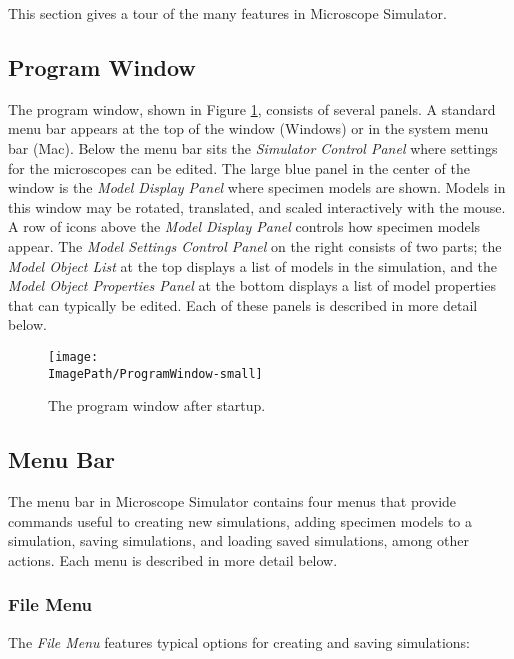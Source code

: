 \documentclass[11pt,titlepage,twoside]{article}
\begin{document}
This section gives a tour of the many features in Microscope Simulator.

\subsection{Program Window}

The program window, shown in Figure \ref{fig:ProgramWindow}, consists of several panels. A standard menu bar appears at the top of the window (Windows) or in the system menu bar (Mac). Below the menu bar sits the \emph{Simulator Control Panel} where settings for the microscopes can be edited. The large blue panel in the center of the window is the \emph{Model Display Panel} where specimen models are shown. Models in this window may be rotated, translated, and scaled interactively with the mouse. A row of icons above the \emph{Model Display Panel} controls how specimen models appear. The \emph{Model Settings Control Panel} on the right consists of two parts; the \emph{Model Object List} at the top displays a list of models in the simulation, and the \emph{Model Object Properties Panel} at the bottom displays a list of model properties that can typically be edited. Each of these panels is described in more detail below.

\begin{figure}[htbp] %
   \centering
   \texttt{[image: \\ImagePath/ProgramWindow-small]} 
   \caption{The program window after startup.}
   \label{fig:ProgramWindow}
\end{figure}

\subsection{Menu Bar}

The menu bar in Microscope Simulator contains four menus that provide commands useful to creating new simulations, adding specimen models to a simulation, saving simulations, and loading saved simulations, among other actions. Each menu is described in more detail below.

\subsubsection{File Menu}

The \emph{File Menu} features typical options for creating and saving simulations:
\end{document}
